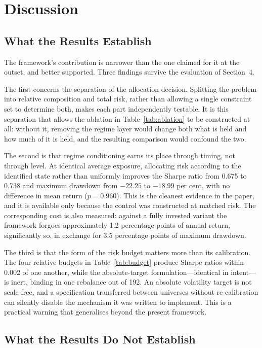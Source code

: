 \section{Discussion}
\label{sec:discussion}

\subsection{What the Results Establish}

The framework's contribution is narrower than the one claimed for it at the outset, and
better supported. Three findings survive the evaluation of Section~4.

The first concerns the separation of the allocation decision. Splitting the problem into
relative composition and total risk, rather than allowing a single constraint set to
determine both, makes each part independently testable. It is this separation that
allows the ablation in Table~\ref{tab:ablation} to be constructed at all: without it, removing the regime
layer would change both what is held and how much of it is held, and the resulting
comparison would confound the two.

The second is that regime conditioning earns its place through timing, not through
level. At identical average exposure, allocating risk according to the identified state
rather than uniformly improves the Sharpe ratio from 0.675 to 0.738 and maximum
drawdown from $-22.25$ to $-18.99$ per cent, with no difference in mean return
($p = 0.960$). This is the cleanest evidence in the paper, and it is available only
because the control was constructed at matched risk. The corresponding cost is also
measured: against a fully invested variant the framework forgoes approximately 1.2
percentage points of annual return, significantly so, in exchange for 3.5 percentage
points of maximum drawdown.

The third is that the form of the risk budget matters more than its calibration. The
four relative budgets in Table~\ref{tab:budget} produce Sharpe ratios within 0.002 of one another,
while the absolute-target formulation---identical in intent---is inert, binding in one
rebalance out of 192. An absolute volatility target is not scale-free, and a
specification transferred between universes without re-calibration can silently disable
the mechanism it was written to implement. This is a practical warning that generalises
beyond the present framework.

\subsection{What the Results Do Not Establish}

